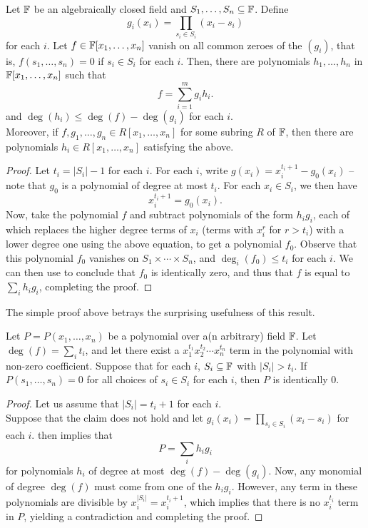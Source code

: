 	\begin{ftheo}
		\label{thm: comb null}
		Let $\mathbb{F}$ be an algebraically closed field and $S_1,\ldots,S_n \subseteq \mathbb{F}$. Define
		\[ g_i(x_i) = \prod_{s_i \in S_i} (x_i - s_i) \]
		for each $i$. Let $f \in \mathbb{F}[x_1,\ldots,x_n]$ vanish on all common zeroes of the $(g_i)$, that is, $f(s_1,\ldots,s_n) = 0$ if $s_i \in S_i$ for each $i$. Then, there are polynomials $h_1,\ldots,h_n$ in $\mathbb{F}[x_1,\ldots,x_n]$ such that
		\[ f = \sum_{i=1}^{m} g_i h_i. \]
		and $\deg(h_i) \le \deg(f) - \deg(g_i)$ for each $i$.\\
		Moreover, if $f,g_1,\ldots,g_n \in R[x_1,\ldots,x_n]$ for some subring $R$ of $\mathbb{F}$, then there are polynomials $h_i \in R[x_1,\ldots,x_n]$ satisfying the above.
	\end{ftheo}
	\begin{proof}
		Let $t_i = |S_i| - 1$ for each $i$. For each $i$, write $g(x_i) = x_i^{t_i+1} - g_0(x_i)$ -- note that $g_0$ is a polynomial of degree at most $t_i$. For each $x_i \in S_i$, we then have
		\[ x_i^{t_i + 1} = g_0(x_i). \]
		Now, take the polynomial $f$ and subtract polynomials of the form $h_i g_i$, each of which replaces the higher degree terms of $x_i$ (terms with $x_i^{r}$ for $r > t_i$) with a lower degree one using the above equation, to get a polynomial $f_0$. Observe that this polynomial $f_0$ vanishes on $S_1 \times \cdots \times S_n$, and $\deg_i(f_0) \le t_i$ for each $i$. We can then use  to conclude that $f_0$ is identically zero, and thus that $f$ is equal to $\sum_i h_i g_i$, completing the proof.
	\end{proof}

	The simple proof above betrays the surprising usefulness of this result.

	\begin{fcor}
		\label{thm: cube-vanishing}
		Let $P = P(x_1,\ldots,x_n)$ be a polynomial over a(n arbitrary) field $\mathbb{F}$. Let $\deg(f) = \sum_i t_i$, and let there exist a $x_1^{t_1} x_2^{t_2} \cdots x_n^{t_n}$ term in the polynomial with non-zero coefficient. Suppose that for each $i$, $S_i \subseteq \mathbb{F}$ with $|S_i| > t_i$. If $P(s_1,\ldots,s_n) = 0$ for all choices of $s_i \in S_i$ for each $i$, then $P$ is identically $0$. 
	\end{fcor}
	\begin{proof}
		Let us assume that $|S_i| = t_i + 1$ for each $i$.\\
		Suppose that the claim does not hold and let $g_i(x_i) = \prod_{s_i \in S_i} (x_i - s_i)$ for each $i$.  then implies that
		\[ P = \sum_i h_i g_i \]
		for polynomials $h_i$ of degree at most $\deg(f) - \deg(g_i)$. Now, any monomial of degree $\deg(f)$ must come from one of the $h_i g_i$. However, any term in these polynomials are divisible by $x_i^{|S_i|} = x_i^{t_i + 1}$, which implies that there is no $x_i^{t_i}$ term in $P$, yielding a contradiction and completing the proof.
	\end{proof}